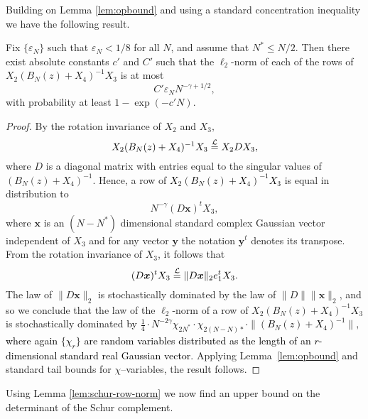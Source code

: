 \documentclass{amsart}
\numberwithin{equation}{section}
\def\corAB{}
\def\corABrev{\textcolor{black}}
\begin{document}
Building on Lemma \ref{lem:opbound} and using a
standard concentration inequality we have the following result.
\begin{lemma}\label{lem:schur-row-norm}
  Fix $\{\varepsilon_N\}$
such that $\varepsilon_N <1/8$ for all $N$, and
assume that
$N^* \le N/2$.
Then there exist absolute constants
$c'$ and $C'$ such that the $\ell_2$-norm of each of the rows
of $X_2 ( B_N(z) +X_4 )^{-1} X_3$ is at most
\[
    C'\varepsilon_N N^{-\gamma+1/2},
\]
with probability at least
\(
1- \exp(-c'N).
\)
\end{lemma}
\begin{proof}
    By the rotation invariance of $X_2$ and $X_3,$
    \[
      X_2 ( B_N(z) +X_4 )^{-1} X_3
      \overset{\mathcal{L}}{=}
      X_2 D X_3,
    \]
    where $D$ is a diagonal matrix with entries
    equal to the singular values of $( B_N(z) +X_4 )^{-1}.$  Hence,
    a row of \corABrev{$X_2( B_N(z) +X_4 )^{-1}X_3$} is equal in distribution to
    \[
      N^{-\gamma}(D {\bm x})^t X_3,
    \]
    where ${\bm x}$ is an $(N-N^*)$ dimensional standard complex
    Gaussian vector independent of $X_3$ \corAB{and for any vector ${\bm y}$ the notation ${\bm y}^t$ denotes its transpose}.  From the
    rotation invariance of $X_3$, it follows that
    \[
      (D {\bm x})^t X_3 \overset{\mathcal{L}}{=} \|D {\bm x}\|_2 e_1^t X_3.
    \]
    The law of $\|D {\bm x}\|_2$ is stochastically dominated by the law
    of $\|D\| \|{\bm x}\|_2$, and so we conclude that the law of \corAB{the $\ell_2$-norm of} a
    row of $X_2( B_N(z) +X_4 )^{-1}X_3$ is stochastically dominated
    \corABrev{by $\frac14 \cdot N^{-2\gamma}\chi_{2N^*} \cdot  \chi_{2(N-N)*}\cdot \|( B_N(z) +X_4 )^{-1}\|,$
    where again $\{\chi_r\}$ are random variables distributed as the
    length of an $r$-dimensional standard real Gaussian vector}.
    Applying Lemma~\ref{lem:opbound} and standard tail bounds for
    $\chi$--variables, the result follows.
\end{proof}
Using Lemma \ref{lem:schur-row-norm} we now find an upper bound on the determinant of the Schur complement.
\end{document}
